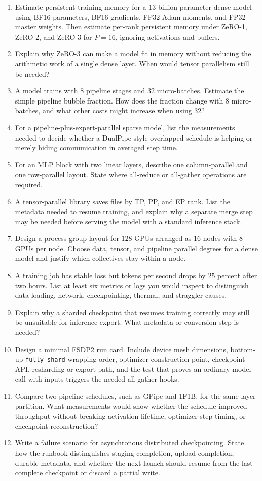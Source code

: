\begin{enumerate}
\item Estimate persistent training memory for a 13-billion-parameter dense model using BF16 parameters, BF16 gradients, FP32 Adam moments, and FP32 master weights. Then estimate per-rank persistent memory under ZeRO-1, ZeRO-2, and ZeRO-3 for $P=16$, ignoring activations and buffers.
\item Explain why ZeRO-3 can make a model fit in memory without reducing the arithmetic work of a single dense layer. When would tensor parallelism still be needed?
\item A model trains with $8$ pipeline stages and $32$ micro-batches. Estimate the simple pipeline bubble fraction. How does the fraction change with $8$ micro-batches, and what other costs might increase when using $32$?
\item For a pipeline-plus-expert-parallel sparse model, list the measurements needed to decide whether a DualPipe-style overlapped schedule is helping or merely hiding communication in averaged step time.
\item For an MLP block with two linear layers, describe one column-parallel and one row-parallel layout. State where all-reduce or all-gather operations are required.
\item A tensor-parallel library saves files by TP, PP, and EP rank. List the metadata needed to resume training, and explain why a separate merge step may be needed before serving the model with a standard inference stack.
\item Design a process-group layout for $128$ GPUs arranged as $16$ nodes with $8$ GPUs per node. Choose data, tensor, and pipeline parallel degrees for a dense model and justify which collectives stay within a node.
\item A training job has stable loss but tokens per second drops by $25$ percent after two hours. List at least six metrics or logs you would inspect to distinguish data loading, network, checkpointing, thermal, and straggler causes.
\item Explain why a sharded checkpoint that resumes training correctly may still be unsuitable for inference export. What metadata or conversion step is needed?
\item Design a minimal FSDP2 run card. Include device mesh dimensions, bottom-up \texttt{fully\_shard} wrapping order, optimizer construction point, checkpoint API, resharding or export path, and the test that proves an ordinary model call with inputs triggers the needed all-gather hooks.
\item Compare two pipeline schedules, such as GPipe and 1F1B, for the same layer partition. What measurements would show whether the schedule improved throughput without breaking activation lifetime, optimizer-step timing, or checkpoint reconstruction?
\item Write a failure scenario for asynchronous distributed checkpointing. State how the runbook distinguishes staging completion, upload completion, durable metadata, and whether the next launch should resume from the last complete checkpoint or discard a partial write.
\end{enumerate}
